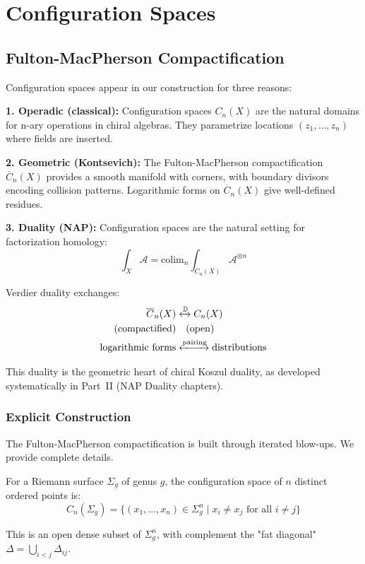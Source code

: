 \chapter{Configuration Spaces}
\section{Fulton-MacPherson Compactification}

\begin{motivation}
Configuration spaces appear in our construction for three reasons:

\textbf{1. Operadic (classical):}
Configuration spaces $C_n(X)$ are the natural domains for n-ary operations in chiral algebras. They parametrize locations $(z_1, \ldots, z_n)$ where fields are inserted.

\textbf{2. Geometric (Kontsevich):}
The Fulton-MacPherson compactification $\overline{C}_n(X)$ provides a smooth manifold with corners, with boundary divisors encoding collision patterns. Logarithmic forms on $\overline{C}_n(X)$ give well-defined residues.

\textbf{3. Duality (NAP):}
Configuration spaces are the natural setting for factorization homology:
$$\int_X \mathcal{A} = \text{colim}_n \int_{C_n(X)} \mathcal{A}^{\otimes n}$$

Verdier duality exchanges:
\begin{align*}
\overline{C}_n(X) &\xleftrightarrow{\mathbb{D}} C_n(X)\\
\text{(compactified)} & \quad \text{(open)}\\
\text{logarithmic forms} &\xleftrightarrow{\text{pairing}} \text{distributions}
\end{align*}

This duality is the geometric heart of chiral Koszul duality, as developed systematically in Part~II (NAP Duality chapters).
\end{motivation}

\subsection{Explicit Construction}

The Fulton-MacPherson compactification is built through iterated blow-ups. We provide complete details.

\begin{definition}\label{def:config-space-genus-g}
For a Riemann surface $\Sigma_g$ of genus $g$, the configuration space of $n$ distinct ordered points is:
$$C_n(\Sigma_g) = \{(x_1, \ldots, x_n) \in \Sigma_g^n \mid x_i \neq x_j \text{ for all } i \neq j\}$$

This is an open dense subset of $\Sigma_g^n$, with complement the "fat diagonal" $\Delta = \bigcup_{i<j} \Delta_{ij}$.
\end{definition}

